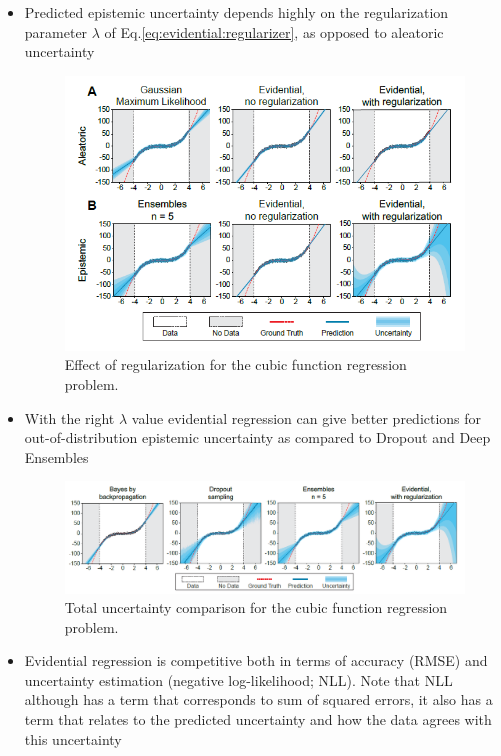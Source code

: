 \begin{itemize}
	\item Predicted epistemic uncertainty depends highly on the regularization parameter $\lambda$ of Eq.\eqref{eq:evidential:regularizer}, as opposed to aleatoric uncertainty
	\begin{figure}[H]
		\centering
		\includegraphics[width=.85\linewidth]{./figs/regularization.png}
		\caption{Effect of regularization for the cubic function regression problem.}
		\label{fig:regularization}
	\end{figure}	
	\item With the right $\lambda$ value evidential regression can give better predictions for out-of-distribution epistemic uncertainty as compared to Dropout and Deep Ensembles
	\begin{figure}[H]
		\centering
		\includegraphics[width=1\linewidth]{./figs/uncertainty.png}
		\caption{Total uncertainty comparison for the cubic function regression problem.}
		\label{fig:uncertainty}
	\end{figure}
	\item Evidential regression is competitive both in terms of accuracy (RMSE) and uncertainty estimation (negative log-likelihood; NLL).
	Note that NLL although has a term that corresponds to sum of squared errors, it also has a term that relates to the predicted uncertainty and how the data agrees with this uncertainty
	\begin{figure}[H]
		\centering

\end{figure}
\end{itemize}

